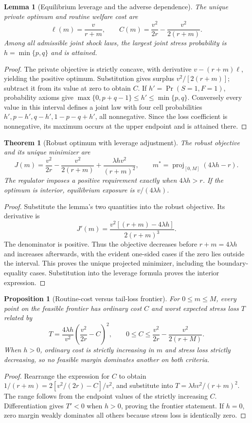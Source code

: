 \documentclass[11pt]{article}
\newtheorem{theorem}{Theorem}
\newtheorem{proposition}{Proposition}
\newtheorem{lemma}{Lemma}
\theoremstyle{definition}
\begin{document}
\begin{lemma}[Equilibrium leverage and the adverse dependence]
The unique private optimum and routine welfare cost are
\[
 \ell(m)=\frac{v}{r+m},\qquad
 C(m)=\frac{v^2}{2r}-\frac{v^2}{2(r+m)}.
\]
Among all admissible joint shock laws, the largest joint stress probability is $h=\min\{p,q\}$ and is attained.
\end{lemma}
\begin{proof}
The private objective is strictly concave, with derivative $v-(r+m)\ell$, yielding the positive optimum. Substitution gives surplus $v^2/[2(r+m)]$; subtract it from its value at zero to obtain $C$.
If $h'=\Pr(S=1,F=1)$, probability axioms give $\max\{0,p+q-1\}\leq h'\leq\min\{p,q\}$. Conversely every value in this interval defines a joint law with four cell probabilities $h',p-h',q-h',1-p-q+h'$, all nonnegative. Since the loss coefficient is nonnegative, its maximum occurs at the upper endpoint and is attained there.
\end{proof}

\begin{theorem}[Robust optimum with leverage adjustment]
The robust objective and its unique minimizer are
\[
 J(m)=\frac{v^2}{2r}-\frac{v^2}{2(r+m)}
          +\frac{\lambda h v^2}{(r+m)^2},\qquad
 m^*=\operatorname{proj}_{[0,M]}(4\lambda h-r).
\]
The regulator imposes a positive requirement exactly when $4\lambda h>r$. If the optimum is interior, equilibrium exposure is $v/(4\lambda h)$.
\end{theorem}
\begin{proof}
Substitute the lemma's two quantities into the robust objective. Its derivative is
\[
 J'(m)=\frac{v^2[(r+m)-4\lambda h]}{2(r+m)^3}.
\]
The denominator is positive. Thus the objective decreases before $r+m=4\lambda h$ and increases afterwards, with the evident one-sided cases if the zero lies outside the interval. This proves the unique projected minimizer, including the boundary-equality cases. Substitution into the leverage formula proves the interior expression.
\end{proof}

\begin{proposition}[Routine-cost versus tail-loss frontier]
For $0\leq m\leq M$, every point on the feasible frontier has ordinary cost $C$ and worst expected stress loss $T$ related by
\[
 T=\frac{4\lambda h}{v^2}
        \left(\frac{v^2}{2r}-C\right)^2,
 \qquad
 0\leq C\leq\frac{v^2}{2r}-\frac{v^2}{2(r+M)}.
\]
When $h>0$, ordinary cost is strictly increasing in $m$ and stress loss strictly decreasing, so no feasible margin dominates another on both criteria.
\end{proposition}
\begin{proof}
Rearrange the expression for $C$ to obtain $1/(r+m)=2[v^2/(2r)-C]/v^2$, and substitute into $T=\lambda h v^2/(r+m)^2$. The range follows from the endpoint values of the strictly increasing $C$. Differentiation gives $T'<0$ when $h>0$, proving the frontier statement. If $h=0$, zero margin weakly dominates all others because stress loss is identically zero.
\end{proof}
\end{document}

